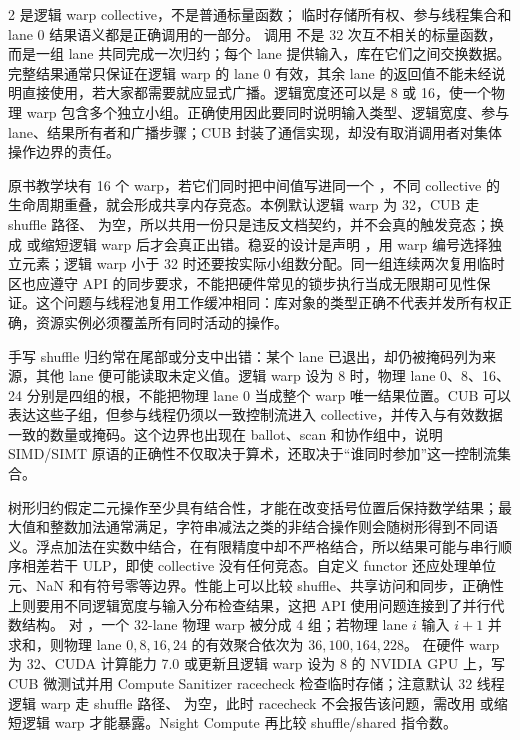 \begin{solutionexercise}{2}
\conclusionheading {} 是逻辑 warp collective，不是普通标量函数；
临时存储所有权、参与线程集合和 lane 0 结果语义都是正确调用的一部分。
\discussionheading
{}
调用  不是 32 次互不相关的标量函数，而是一组 lane 共同完成一次归约；每个 lane 提供输入，库在它们之间交换数据。完整结果通常只保证在逻辑 warp 的 lane 0 有效，其余 lane 的返回值不能未经说明直接使用，若大家都需要就应显式广播。逻辑宽度还可以是 8 或 16，使一个物理 warp 包含多个独立小组。正确使用因此要同时说明输入类型、逻辑宽度、参与 lane、结果所有者和广播步骤；CUB 封装了通信实现，却没有取消调用者对集体操作边界的责任。

原书教学块有 16 个 warp，若它们同时把中间值写进同一个 ，不同 collective 的生命周期重叠，就会形成共享内存竞态。本例默认逻辑 warp 为 32，CUB 走 shuffle 路径、 为空，所以共用一份只是违反文档契约，并不会真的触发竞态；换成  或缩短逻辑 warp 后才会真正出错。稳妥的设计是声明 ，用 warp 编号选择独立元素；逻辑 warp 小于 32 时还要按实际小组数分配。同一组连续两次复用临时区也应遵守 API 的同步要求，不能把硬件常见的锁步执行当成无限期可见性保证。这个问题与线程池复用工作缓冲相同：库对象的类型正确不代表并发所有权正确，资源实例必须覆盖所有同时活动的操作。

手写 shuffle 归约常在尾部或分支中出错：某个 lane 已退出，却仍被掩码列为来源，其他 lane 便可能读取未定义值。逻辑 warp 设为 8 时，物理 lane 0、8、16、24 分别是四组的根，不能把物理 lane 0 当成整个 warp 唯一结果位置。CUB 可以表达这些子组，但参与线程仍须以一致控制流进入 collective，并传入与有效数据一致的数量或掩码。这个边界也出现在 ballot、scan 和协作组中，说明 SIMD/SIMT 原语的正确性不仅取决于算术，还取决于“谁同时参加”这一控制流集合。

树形归约假定二元操作至少具有结合性，才能在改变括号位置后保持数学结果；最大值和整数加法通常满足，字符串减法之类的非结合操作则会随树形得到不同语义。浮点加法在实数中结合，在有限精度中却不严格结合，所以结果可能与串行顺序相差若干 ULP，即使 collective 没有任何竞态。自定义 functor 还应处理单位元、NaN 和有符号零等边界。性能上可以比较 shuffle、共享访问和同步，正确性上则要用不同逻辑宽度与输入分布检查结果，这把 API 使用问题连接到了并行代数结构。
\variantheading 对 ，一个 32-lane 物理 warp 被分成 4 组；若物理 lane $i$ 输入 $i+1$ 并求和，则物理 lane $0,8,16,24$ 的有效聚合依次为 $36,100,164,228$。
\practiceheading 在硬件 warp 为 32、CUDA 计算能力 7.0 或更新且逻辑 warp 设为 8 的 NVIDIA GPU 上，写 CUB 微测试并用 Compute Sanitizer racecheck 检查临时存储；注意默认 32 线程逻辑 warp 走 shuffle 路径、 为空，此时 racecheck 不会报告该问题，需改用  或缩短逻辑 warp 才能暴露。Nsight Compute 再比较 shuffle/shared 指令数。
\end{solutionexercise}

